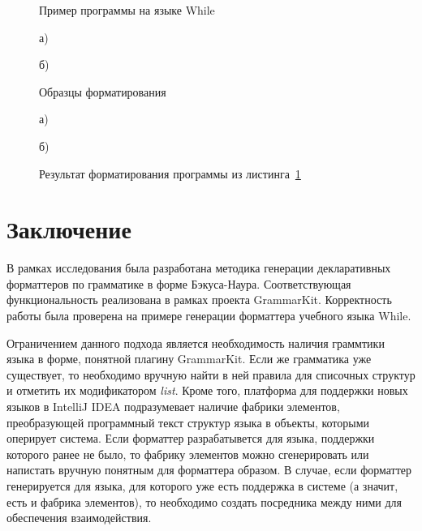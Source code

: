 \documentclass[conference]{IEEEtran}
\begin{document}
\begin{figure}[h]
	\centering
	
	\caption{Пример программы на языке While}
	\label{whileProg}
\end{figure}

\begin{figure}[ht]
\noindent\begin{minipage}{.2\textwidth}
    
\caption*{а)}    
\end{minipage}\hfill
\begin{minipage}{.2\textwidth}
    
\caption*{б)}    
\end{minipage}
\caption{Образцы форматирования}    
\label{whileTs}
\end{figure}

\begin{figure}[ht]
\noindent\begin{minipage}{.2\textwidth}
    
\caption*{а)}    
\end{minipage}\hfill
\begin{minipage}{.2\textwidth}
    
\caption*{б)}    
\end{minipage}
\caption{Результат форматирования программы из листинга~\ref{whileProg}}
\label{whileRes}
\end{figure}

\section{Заключение}
В рамках исследования была разработана методика генерации декларативных форматтеров по грамматике в форме Бэкуса-Наура.
Соответствующая функциональность реализована в рамках проекта GrammarKit.
Корректность работы была проверена на примере генерации форматтера учебного языка While.

Ограничением данного подхода является необходимость наличия граммтики языка в форме, понятной плагину GrammarKit. 
Если же грамматика уже существует, то необходимо вручную найти в ней правила для списочных структур и отметить их модификатором \emph{list}.
Кроме того, платформа для поддержки новых языков в IntelliJ IDEA подразумевает наличие фабрики элементов, преобразующей программный текст структур языка в объекты, которыми оперирует система.
Если форматтер разрабатывется для языка, поддержки которого ранее не было, то фабрику элементов можно сгенерировать или напистать вручную понятным для форматтера образом.
В случае, если форматтер генерируется для языка, для которого уже есть поддержка в системе (а значит, есть и фабрика элементов), то необходимо создать посредника между ними для обеспечения взаимодействия.
\end{document}
